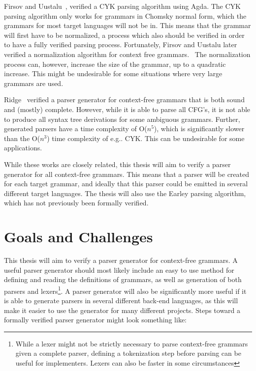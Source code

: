 \documentclass{article}
\begin{document}
	Firsov and Uustalu~\cite{Firsov14}, verified a CYK parsing algorithm using
	Agda. The CYK parsing algorithm only works for grammars in Chomsky normal
	form, which the grammars for most target languages will not be in. This
	means that the grammar will first have to be normalized, a process which
	also should be verified in order to have a fully verified parsing process.
	Fortunately, Firsov and Uustalu later verified a normalization algorithm
	for context free grammars.~\cite{Firsov15} The normalization process can,
	however, increase the size of the grammar, up to a quadratic increase. This
	might be undesirable for some situations where very large grammars are
	used.

	Ridge~\cite{ridge11} verified a parser generator for context-free grammars
	that is both sound and (mostly) complete. However, while it is able to
	parse all CFG's, it is not able to produce all syntax tree derivations for
	some ambiguous grammars. Further, generated parsers have a time complexity
	of O($n^5$), which is significantly slower than the O($n^3$) time
	complexity of e.g.. CYK. This can be undesirable for some applications.

	While these works are closely related, this thesis will aim to verify a
	parser generator for all context-free grammars. This means that a parser
	will be created for each target grammar, and ideally that this parser could
	be emitted in several different target languages. The thesis will also use
	the Earley parsing algorithm, which has not previously been formally
	verified.

\section{Goals and Challenges}
	

	This thesis will aim to verify a parser generator for context-free
	grammars. A useful parser generator should most likely include an easy to
	use method for defining and reading the definitions of grammars, as well as
	generation of both parsers and lexers\footnote{While a lexer might not be
	strictly necessary to parse context-free grammars given a complete parser,
	defining a tokenization step before parsing can be useful for implementers.
	Lexers can also be faster in some circumstances}. A parser generator will
	also be significantly more useful if it is able to generate parsers in
	several different back-end languages, as this will make it easier to use
	the generator for many different projects.  Steps toward a formally
	verified parser generator might look something like:
\end{document}
